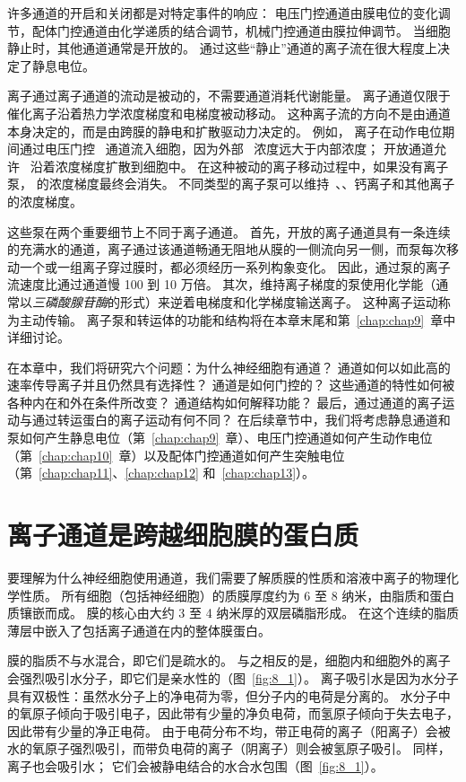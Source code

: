 许多通道的开启和关闭都是对特定事件的响应：
电压门控通道由膜电位的变化调节，配体门控通道由化学递质的结合调节，机械门控通道由膜拉伸调节。
当细胞静止时，其他通道通常是开放的。
通过这些“静止”通道的离子流在很大程度上决定了静息电位。


离子通过离子通道的流动是被动的，不需要通道消耗代谢能量。
离子通道仅限于催化离子沿着热力学浓度梯度和电梯度被动移动。
这种离子流的方向不是由通道本身决定的，而是由跨膜的静电和扩散驱动力决定的。
例如， 离子在动作电位期间通过电压门控~ 通道流入细胞，因为外部~ 浓度远大于内部浓度；
开放通道允许~ 沿着浓度梯度扩散到细胞中。
在这种被动的离子移动过程中，如果没有离子泵， 的浓度梯度最终会消失。
不同类型的离子泵可以维持~、、钙离子和其他离子的浓度梯度。


这些泵在两个重要细节上不同于离子通道。
首先，开放的离子通道具有一条连续的充满水的通道，离子通过该通道畅通无阻地从膜的一侧流向另一侧，而泵每次移动一个或一组离子穿过膜时，都必须经历一系列构象变化。
因此，通过泵的离子流速度比通过通道慢 100 到 10 万倍。
其次，维持离子梯度的泵使用化学能（通常以\textit{三磷酸腺苷酶}的形式）来逆着电梯度和化学梯度输送离子。
这种离子运动称为主动传输。
离子泵和转运体的功能和结构将在本章末尾和第~\ref{chap:chap9}~章中详细讨论。


在本章中，我们将研究六个问题：为什么神经细胞有通道？
通道如何以如此高的速率传导离子并且仍然具有选择性？ 
通道是如何门控的？
这些通道的特性如何被各种内在和外在条件所改变？
通道结构如何解释功能？
最后，通过通道的离子运动与通过转运蛋白的离子运动有何不同？
在后续章节中，我们将考虑静息通道和泵如何产生静息电位（第~\ref{chap:chap9}~章）、电压门控通道如何产生动作电位（第~\ref{chap:chap10}~章）以及配体门控通道如何产生突触电位（第~\ref{chap:chap11}、\ref{chap:chap12} 和~\ref{chap:chap13}）。



\section{离子通道是跨越细胞膜的蛋白质}

要理解为什么神经细胞使用通道，我们需要了解质膜的性质和溶液中离子的物理化学性质。
所有细胞（包括神经细胞）的质膜厚度约为 6 至 8 纳米，由脂质和蛋白质镶嵌而成。
膜的核心由大约 3 至 4 纳米厚的双层磷脂形成。
在这个连续的脂质薄层中嵌入了包括离子通道在内的整体膜蛋白。


膜的脂质不与水混合，即它们是疏水的。
与之相反的是，细胞内和细胞外的离子会强烈吸引水分子，即它们是亲水性的（图~\ref{fig:8_1}）。
离子吸引水是因为水分子具有双极性：虽然水分子上的净电荷为零，但分子内的电荷是分离的。
水分子中的氧原子倾向于吸引电子，因此带有少量的净负电荷，而氢原子倾向于失去电子，因此带有少量的净正电荷。
由于电荷分布不均，带正电荷的离子（阳离子）会被水的氧原子强烈吸引，而带负电荷的离子（阴离子）则会被氢原子吸引。
同样，离子也会吸引水；
它们会被静电结合的水合水包围（图~\ref{fig:8_1}）。


